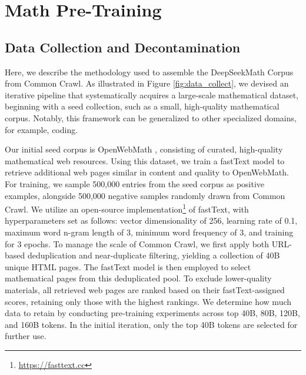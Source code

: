 \section{Math Pre-Training}

\subsection{Data Collection and Decontamination} Here, we describe the methodology used to assemble the DeepSeekMath Corpus from Common Crawl. As illustrated in Figure \ref{fig:data_collect}, we devised an iterative pipeline that systematically acquires a large-scale mathematical dataset, beginning with a seed collection, such as a small, high-quality mathematical corpus. Notably, this framework can be generalized to other specialized domains, for example, coding.

Our initial seed corpus is OpenWebMath \citep{openwebmath}, consisting of curated, high-quality mathematical web resources. Using this dataset, we train a fastText model \citep{joulin2016fasttext} to retrieve additional web pages similar in content and quality to OpenWebMath. For training, we sample 500,000 entries from the seed corpus as positive examples, alongside 500,000 negative samples randomly drawn from Common Crawl. We utilize an open-source implementation\footnote{\url{https://fasttext.cc}} of fastText, with hyperparameters set as follows: vector dimensionality of 256, learning rate of 0.1, maximum word n-gram length of 3, minimum word frequency of 3, and training for 3 epochs. To manage the scale of Common Crawl, we first apply both URL-based deduplication and near-duplicate filtering, yielding a collection of 40B unique HTML pages. The fastText model is then employed to select mathematical pages from this deduplicated pool. To exclude lower-quality materials, all retrieved web pages are ranked based on their fastText-assigned scores, retaining only those with the highest rankings. We determine how much data to retain by conducting pre-training experiments across top 40B, 80B, 120B, and 160B tokens. In the initial iteration, only the top 40B tokens are selected for further use.

